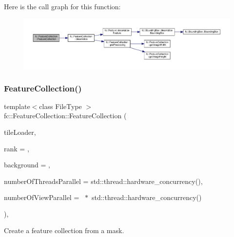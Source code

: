 Here is the call graph for this function\+:
\nopagebreak
\begin{figure}[H]
\begin{center}
\leavevmode
\includegraphics[width=350pt]{d9/d78/classfc_1_1FeatureCollection_aa5d92c395512b9dd5d6c240fa150f992_cgraph}
\end{center}
\end{figure}
\mbox{\label{classfc_1_1FeatureCollection_acc38a1542fc4dc04175961140677ac51}} 
\subsubsection{\texorpdfstring{Feature\+Collection()}{FeatureCollection()}\hspace{0.1cm}{\footnotesize\ttfamily [3/3]}}
{\footnotesize\ttfamily template$<$class File\+Type $>$ \\
fc\+::\+Feature\+Collection\+::\+Feature\+Collection (\begin{DoxyParamCaption}\item[{\hyperlink{classfi_1_1ATileLoader}{fi\+::\+A\+Tile\+Loader}$<$ File\+Type $>$ $\ast$}]{tile\+Loader,  }\item[{uint8\+\_\+t}]{rank = {},  }\item[{File\+Type}]{background = {},  }\item[{uint32\+\_\+t}]{number\+Of\+Threads\+Parallel = {\ttfamily std\+:\+:thread\+:\+:hardware\+\_\+concurrency()},  }\item[{uint32\+\_\+t}]{number\+Of\+View\+Parallel = {~$\ast$~std\+:\+:thread\+:\+:hardware\+\_\+concurrency()} }\end{DoxyParamCaption})\hspace{0.3cm}{\ttfamily [inline]}, {\ttfamily [explicit]}}



Create a feature collection from a mask. 


